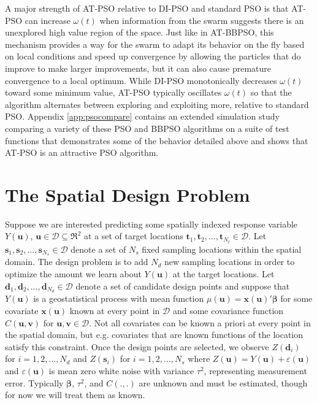 \documentclass[12pt]{article}
\begin{document}
A major strength of AT-PSO relative to DI-PSO and standard PSO is that AT-PSO can increase $\omega(t)$ when information from the swarm suggests there is an unexplored high value region of the space. Just like in AT-BBPSO, this mechanism provides a way for the swarm to adapt its behavior on the fly based on local conditions and speed up convergence by allowing the particles that do improve to make larger improvements, but it can also cause premature convergence to a local optimum. While DI-PSO monotonically decreases $\omega(t)$ toward some minimum value, AT-PSO typically oscillates $\omega(t)$ so that the algorithm alternates between exploring and exploiting more, relative to standard PSO. Appendix \ref{app:psocompare} contains an extended simulation study comparing a variety of these PSO and BBPSO algorithms on a suite of test functions that demonstrates some of the behavior detailed above and shows that AT-PSO is an attractive PSO algorithm. 

\section{The Spatial Design Problem}\label{sec:spatialdesign}
Suppose we are interested predicting some spatially indexed response variable $Y(\bm{u})$, $\bm{u}\in \mathcal{D}\subseteq \Re^2$ at a set of target locations $\bm{t}_1, \bm{t}_2, \dots, \bm{t}_{N_t}\in\mathcal{D}$. Let $\bm{s}_1, \bm{s}_2, \dots, \bm{s}_{N_s}\in\mathcal{D}$ denote a set of $N_s$ fixed sampling locations within the spatial domain. The design problem is to add $N_d$ new sampling locations in order to optimize the amount we learn about $Y(\bm{u})$ at the target locations. Let $\bm{d}_1, \bm{d}_2, \dots, \bm{d}_{N_d}\in\mathcal{D}$ denote a set of candidate design points and suppose that $Y(\bm{u})$ is a geostatistical process with mean function $\mu(\bm{u})=\bm{x}(\bm{u})'\bm{\beta}$ for some covariate $\bm{x}(\bm{u})$ known at every point in $\mathcal{D}$ and some covariance function $C(\bm{u}, \bm{v})$ for $\bm{u},\bm{v}\in\mathcal{D}$. Not all covariates can be known a priori at every point in the spatial domain, but e.g. covariates that are known functions of the location satisfy this constraint. Once the design points are selected, we observe $Z(\bm{d}_i)$ for $i=1,2,\dots,N_d$ and $Z(\bm{s}_i)$ for $i=1,2,\dots,N_s$ where $Z(\bm{u}) = Y(\bm{u}) + \varepsilon(\bm{u})$ and $\varepsilon(\bm{u})$ is mean zero white noise with variance $\tau^2$, representing measurement error. Typically $\bm{\beta}$, $\tau^2$, and $C(.,.)$ are unknown and must be estimated, though for now we will treat them as known.
\end{document}
